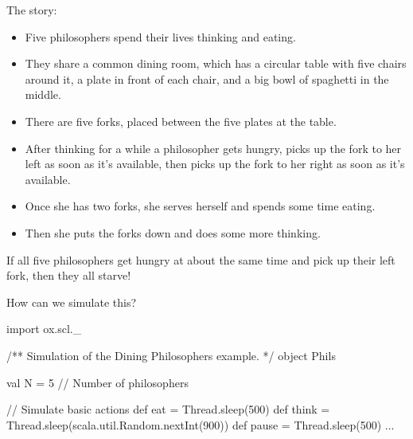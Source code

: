 \documentclass[notes,color]{sepslide0}
\begin{document}


\begin{slide}

The story:
\begin{itemize}
\item Five philosophers spend their lives thinking and eating.

\item 
They share a common dining room, which has a circular table with five chairs
around it, a plate in front of each chair, and a big bowl of spaghetti in the
middle.

\item 
There are  five forks, placed between the five plates at the table.

\item 
After thinking for a while a philosopher gets hungry, picks up the fork to her
left as soon as it's available, then picks up the fork to her right as soon as
it's available.

\item 
Once she has two forks, she serves herself and spends some time eating.

\item 
Then she puts the forks down and does some more thinking.
\end{itemize}
\end{slide}


\begin{slide}

If all five philosophers get hungry at about the same time and pick up their
left fork, then they all starve!

How can we simulate this?
\end{slide}


\begin{slide}

\begin{scala}
import ox.scl._

/** Simulation of the Dining Philosophers example. */
object Phils{
  val N = 5 // Number of philosophers

  // Simulate basic actions
  def eat = Thread.sleep(500)
  def think = Thread.sleep(scala.util.Random.nextInt(900))
  def pause = Thread.sleep(500)
  ...
}
\end{scala}
\end{slide}
\end{document}
